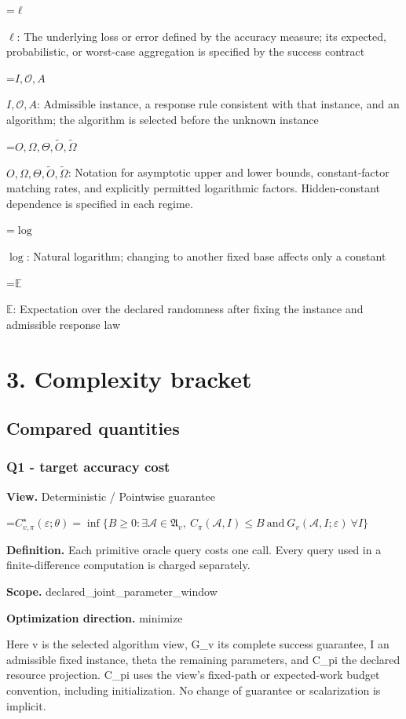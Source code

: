 \documentclass[10pt,a4paper]{article}
\newcommand{\AtlasMath}[1]{\par\begingroup\centering\setbox0=\hbox{$\displaystyle #1$}\ifdim\wd0>1.4\linewidth\typeout{ATLAS WIDE FORMULA: \the\wd0}\fi\ifdim\wd0>\linewidth\resizebox{\linewidth}{!}{\box0}\else\box0\fi\par\endgroup}
\newcommand{\AtlasInlineMath}[1]{\begingroup\setbox0=\hbox{$#1$}\ifdim\wd0>.4\linewidth\endgroup\AtlasMath{#1}\else\endgroup$#1$\fi}
\begin{document}
\AtlasInlineMath{\ell}: The underlying loss or error defined by the accuracy measure; its expected, probabilistic, or worst-case aggregation is specified by the success contract

\AtlasInlineMath{I,\mathcal{O},A}: Admissible instance, a response rule consistent with that instance, and an algorithm; the algorithm is selected before the unknown instance

\AtlasInlineMath{O,\Omega,\Theta,\widetilde{O},\widetilde\Omega}: Notation for asymptotic upper and lower bounds, constant-factor matching rates, and explicitly permitted logarithmic factors. Hidden-constant dependence is specified in each regime.

\AtlasInlineMath{\log}: Natural logarithm; changing to another fixed base affects only a constant

\AtlasInlineMath{\mathbb{E}}: Expectation over the declared randomness after fixing the instance and admissible response law

\section{3. Complexity bracket}
\subsection{Compared quantities}
\subsubsection{Q1 - target accuracy cost}
\textbf{View.} Deterministic / Pointwise guarantee

\AtlasMath{C^\star_{v,\pi}(\varepsilon;\theta)=\inf\{B\ge0:\exists\mathcal A\in\mathfrak A_v,\ C_\pi(\mathcal A,I)\le B\ \text{and}\ G_v(\mathcal A,I;\varepsilon)\ \forall I\}}
\textbf{Definition.} Each primitive oracle query costs one call. Every query used in a finite-difference computation is charged separately.

\textbf{Scope.} declared\_joint\_parameter\_window

\textbf{Optimization direction.} minimize

Here v is the selected algorithm view, G\_v its complete success guarantee, I an admissible fixed instance, theta the remaining parameters, and C\_pi the declared resource projection. C\_pi uses the view's fixed-path or expected-work budget convention, including initialization. No change of guarantee or scalarization is implicit.
\end{document}
